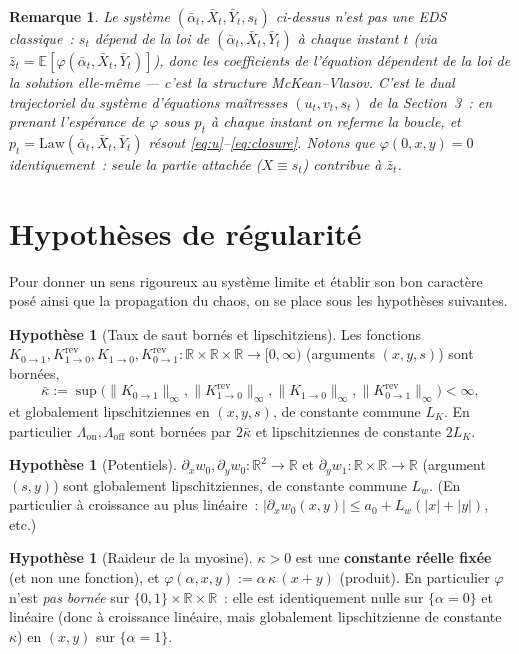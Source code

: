 \documentclass[11pt,a4paper]{article}
\newcommand{\E}{\mathbb{E}}
\newcommand{\R}{\mathbb{R}}
\newcommand{\Lon}{\Lambda_{\mathrm{on}}}
\newcommand{\Loff}{\Lambda_{\mathrm{off}}}
\theoremstyle{plain}
\newtheorem*{remark*}{Remarque}
\theoremstyle{definition}
\newtheorem{hyp}[thm]{Hypothèse}
\begin{document}
\begin{remark*}
Le syst\`eme $(\bar\alpha_t,\bar X_t,\bar Y_t,s_t)$ ci-dessus n'est pas une EDS classique~: $s_t$ d\'epend de la loi de $(\bar\alpha_t,\bar X_t,\bar Y_t)$ \`a chaque instant $t$ (via $\bar z_t=\E[\varphi(\bar\alpha_t,\bar X_t,\bar Y_t)]$), donc les coefficients de l'\'equation d\'ependent de la loi de la solution elle-m\^eme --- c'est la structure McKean--Vlasov. C'est le dual trajectoriel du syst\`eme d'\'equations ma\^itresses $(u_t,v_t,s_t)$ de la Section~3~: en prenant l'esp\'erance de $\varphi$ sous $p_t$ \`a chaque instant on referme la boucle, et $p_t=\mathrm{Law}(\bar\alpha_t,\bar X_t,\bar Y_t)$ r\'esout \eqref{eq:u}--\eqref{eq:closure}. Notons que $\varphi(0,x,y)=0$ identiquement~: seule la partie attach\'ee ($X\equiv s_t$) contribue \`a $\bar z_t$.
\end{remark*}

\section{Hypoth\`eses de r\'egularit\'e}
\label{sec:hyp}

Pour donner un sens rigoureux au syst\`eme limite et \'etablir son bon caract\`ere pos\'e ainsi que la propagation du chaos, on se place sous les hypoth\`eses suivantes.

\begin{hyp}[Taux de saut born\'es et lipschitziens]
\label{hyp:K}
Les fonctions $K_{0\to1},K_{1\to0}^{\mathrm{rev}},K_{1\to0},K_{0\to1}^{\mathrm{rev}}:\R\times\R\times\R\to[0,\infty)$ (arguments $(x,y,s)$) sont born\'ees,
\[
\bar\kappa:=\sup\big(\|K_{0\to1}\|_\infty,\|K_{1\to0}^{\mathrm{rev}}\|_\infty,\|K_{1\to0}\|_\infty,\|K_{0\to1}^{\mathrm{rev}}\|_\infty\big)<\infty,
\]
et globalement lipschitziennes en $(x,y,s)$, de constante commune $L_K$. En particulier $\Lon,\Loff$ sont born\'ees par $2\bar\kappa$ et lipschitziennes de constante $2L_K$.
\end{hyp}

\begin{hyp}[Potentiels]
\label{hyp:w}
$\partial_xw_0,\partial_yw_0:\R^2\to\R$ et $\partial_yw_1:\R\times\R\to\R$ (argument $(s,y)$) sont globalement lipschitziennes, de constante commune $L_w$. (En particulier \`a croissance au plus lin\'eaire~: $|\partial_xw_0(x,y)|\le a_0+L_w(|x|+|y|)$, etc.)
\end{hyp}

\begin{hyp}[Raideur de la myosine]
\label{hyp:kappa}
$\kappa>0$ est une \textbf{constante r\'eelle fix\'ee} (et non une fonction), et $\varphi(\alpha,x,y):=\alpha\,\kappa\,(x+y)$ (produit). En particulier $\varphi$ n'est \emph{pas born\'ee} sur $\{0,1\}\times\R\times\R$~: elle est identiquement nulle sur $\{\alpha=0\}$ et lin\'eaire (donc \`a croissance lin\'eaire, mais globalement lipschitzienne de constante $\kappa$) en $(x,y)$ sur $\{\alpha=1\}$.
\end{hyp}
\end{document}
